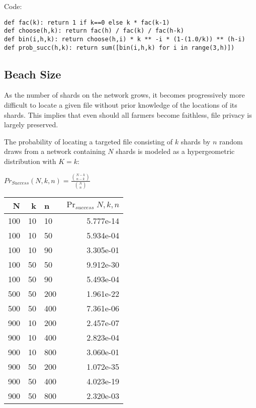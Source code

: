 \documentclass[a4paper,10pt]{article}
\begin{document}
Code:
\begin{lstlisting}
def fac(k): return 1 if k==0 else k * fac(k-1)
def choose(h,k): return fac(h) / fac(k) / fac(h-k)
def bin(i,h,k): return choose(h,i) * k ** -i * (1-(1.0/k)) ** (h-i)
def prob_succ(h,k): return sum([bin(i,h,k) for i in range(3,h)])
\end{lstlisting}

\subsection{Beach Size}
As the number of shards on the network grows, it becomes progressively more
difficult to locate a given file without prior knowledge of the locations of its
shards. This implies that even should all farmers become faithless, file privacy
is largely preserved.

The probability of locating a targeted file consisting of $ k $ shards by $ n $
random draws from a network containing $ N $ shards is modeled as a
hypergeometric distribution with $ K = k $:

{\centering
$Pr_{Success}(N,k,n) = \displaystyle \frac{{N-k \choose n-k}}{{N \choose n}}$
\\}

\begin{table}[hbt!]
\begin{center}
\begin{tabular}{r r l r}
N & k & n & $\Pr_{success}{N,k,n}$\\
\hline 100 & 10 & 10  & 5.777e-14\\
\hline 100 & 10 & 50  & 5.934e-04\\
\hline 100 & 10 & 90  & 3.305e-01\\
\hline 100 & 50 & 50  & 9.912e-30\\
\hline 100 & 50 & 90  & 5.493e-04\\
\hline 500 & 50 & 200 & 1.961e-22\\
\hline 500 & 50 & 400 & 7.361e-06\\
\hline 900 & 10 & 200 & 2.457e-07\\
\hline 900 & 10 & 400 & 2.823e-04\\
\hline 900 & 10 & 800 & 3.060e-01\\
\hline 900 & 50 & 200 & 1.072e-35\\
\hline 900 & 50 & 400 & 4.023e-19\\
\hline 900 & 50 & 800 & 2.320e-03\\
\end{tabular}
\end{center}
\end{table}
\end{document}
